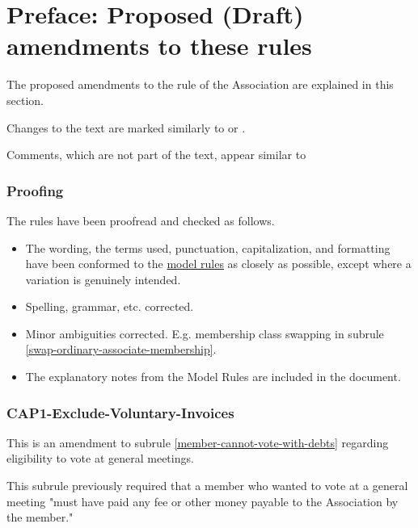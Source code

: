 \documentclass[../constitution.tex]{subfiles}
\begin{document}
\part*{Preface: Proposed (Draft) amendments to these rules}


The proposed amendments to the rule of the Association are explained in this section.

Changes to the text are marked similarly to  or .

Comments, which are not part of the text, appear similar to 

\section*{Proofing}

The rules have been proofread and checked as follows.

\begin{itemize}
    \item The wording, the terms used, punctuation, capitalization, and formatting have been conformed to the \href{https://www.commerce.wa.gov.au/consumer-protection/model-rules}{model rules} as closely as possible, except where a variation is genuinely intended.
    \item Spelling, grammar, etc. corrected.
    \item Minor ambiguities corrected. E.g. membership class swapping in subrule \ref{swap-ordinary-associate-membership}.
    \item The explanatory notes from the Model Rules are included in the document.
\end{itemize}

\section*{CAP1-Exclude-Voluntary-Invoices}

This is an amendment to subrule \ref{member-cannot-vote-with-debts} regarding eligibility to vote at general meetings.

This subrule previously required that a member who wanted to vote at a general meeting "must have paid any fee or other money payable to the Association by the member."
\end{document}
